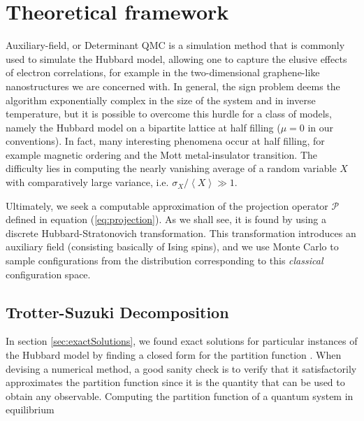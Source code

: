 \section{Theoretical framework}
\label{subsec:theoreticalFramework}

Auxiliary-field, or Determinant \acs{QMC} is a simulation method that is commonly used to simulate the Hubbard model, allowing one to capture the elusive effects of electron correlations, for example in the two-dimensional graphene-like nanostructures we are concerned with.
In general, the sign problem deems the algorithm exponentially complex in the size of the system and in inverse temperature, but it is possible to overcome this hurdle for a class of models, namely the Hubbard model on a bipartite lattice at half filling ($\mu = 0$ in our conventions).
In fact, many interesting phenomena occur at half filling, for example magnetic ordering and the Mott metal-insulator transition.
The difficulty lies in computing the nearly vanishing average of a random variable $X$ with comparatively large variance, i.e. $\sigma_X / \left\langle X \right\rangle \gg 1$.

Ultimately, we seek a computable approximation of the projection operator $\mathcal{P}$ defined in equation (\ref{eq:projection}).
As we shall see, it is found by using a discrete Hubbard-Stratonovich transformation.
This transformation introduces an auxiliary field (consisting basically of Ising spins), and we use Monte Carlo to sample configurations from the distribution corresponding to this \emph{classical} configuration space.

\subsection{Trotter-Suzuki Decomposition}
\label{subsec:trotter}

In section \ref{sec:exactSolutions}, we found exact solutions for particular instances of the Hubbard model by finding a closed form for the partition function \cite{hou_numerical_2009}. When devising a numerical method, a good sanity check is to verify that it satisfactorily approximates the partition function since it is the quantity that can be used to obtain  any observable.
Computing the partition function of a quantum system in equilibrium

